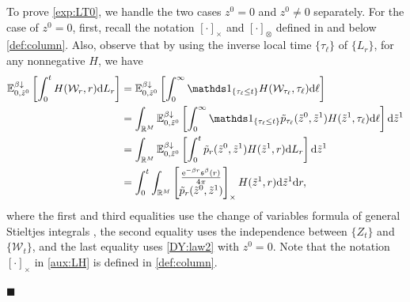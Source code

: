 \documentclass[12pt, twoside]{article}
\numberwithin{figure}{section}
\newcommand{\e}{{\mathrm e}}
\newcommand{\1}{\mathds 1}
\newcommand{\da}{{\downarrow}}
\newcommand{\E}{{\mathbb E}}
\newcommand{\mc}{\mathcal}
\renewcommand{\d}{{\mathrm d}}
\newcommand{\R}{{\Bbb R}}
\newcommand{\2}{{\mathbf 1}}
\newcommand{\s}{{\mathfrak s}}
\renewenvironment{proof}[1][\proofname]{\noindent {\bfseries #1.}\;}{\hfill\ensuremath{\blacksquare}\\}
\begin{document}
\begin{proof}[Proof of Theorem~\ref{thm:formulas}]
To prove \eqref{exp:LT0}, we handle the two cases $z^0=0$ and $z^0\neq 0$ separately. For the case of $z^0=0$, first, recall the notation $[\cdot]_\times$ and $[\cdot]_{\otimes}$ defined in and below \eqref{def:column}. Also, observe that by using the inverse local time $\{\tau_\ell\}$ of $\{L_ r\}$, for any nonnegative $H$, we have
\begin{align}
\E^{\beta\da }_{0,\tilde{z}^0}\left[\int_0^tH(\mc W_ r, r)\d L_ r\right]&=\E^{\beta\da }_{0,\tilde{z}^0}\left[\int_0^\infty\1_{\{\tau_\ell\leq t\}}H(\mc W_{\tau_\ell},\tau_\ell)\d \ell\right]\notag\\
&=\int_{\R^M}\E^{\beta\da }_{0,\tilde{z}^0}\left[\int_0^\infty\1_{\{\tau_\ell\leq t\}}\tilde{p}_{\tau_\ell}(\tilde{z}^0,\tilde{z}^1)H(\tilde{z}^1,\tau_\ell)\d \ell\right]\d\tilde{z}^1\notag\\
&=\int_{\R^M}\E^{\beta\da }_{0,\tilde{z}^0}\left[\int_0^t\tilde{p}_{ r}(\tilde{z}^0,\tilde{z}^1)H(\tilde{z}^1, r)\d L_ r\right]\d\tilde{z}^1\notag\\
&=\int_0^t\int_{\R^M} \begin{bmatrix}
\frac{\e^{-\beta r}\s^\beta( r)}{4\pi}\\
\vspace{-.4cm}\\
\tilde{p}_ r(\tilde{z}^0,\tilde{z}^1)
\end{bmatrix}_\times 
H(\tilde{z}^1, r)\d \tilde{z}^1\d  r,\label{aux:LH}
\end{align}
where the first and third equalities use the change of variables formula of general Stieltjes integrals \cite[(4.9) Proposition on p.8]{RY}, the second equality uses the independence between $\{Z_t\}$ and $\{\mc W_t\}$,
and the last equality uses \eqref{DY:law2} with $z^0=0$. Note that the notation $[\cdot]_\times$ in \eqref{aux:LH} is defined in \eqref{def:column}.


\end{proof}
\end{document}
